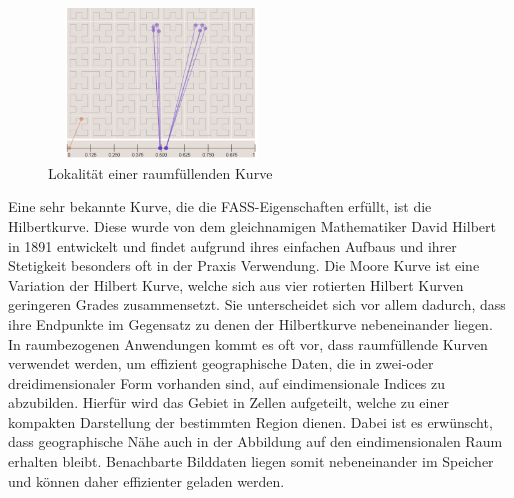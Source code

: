 \documentclass[course=erap]{aspdoc}
\begin{document}
\begin{figure}[h]
\centering
      \includegraphics[width=6cm, height=4cm]{Locality}
    \caption{Lokalität einer raumfüllenden Kurve}
    \label{fig:locality}
\end{figure}

Eine sehr bekannte Kurve, die die FASS-Eigenschaften erfüllt, ist die Hilbertkurve. Diese wurde von dem gleichnamigen Mathematiker David Hilbert in 1891 entwickelt und findet aufgrund ihres einfachen Aufbaus und ihrer Stetigkeit besonders oft in der Praxis Verwendung.
\newline
Die Moore Kurve ist eine Variation der Hilbert Kurve, welche sich aus vier rotierten Hilbert Kurven geringeren Grades zusammensetzt. Sie unterscheidet sich vor allem dadurch, dass ihre Endpunkte im Gegensatz zu denen der Hilbertkurve nebeneinander liegen.
\\
In raumbezogenen Anwendungen kommt es oft vor, dass raumfüllende Kurven verwendet werden, um effizient geographische Daten, die in zwei-oder dreidimensionaler Form vorhanden sind, auf eindimensionale Indices zu abzubilden. Hierfür wird das Gebiet in Zellen aufgeteilt, welche zu einer kompakten Darstellung der bestimmten Region dienen. Dabei ist es erwünscht, dass geographische Nähe auch in der Abbildung auf den eindimensionalen Raum erhalten bleibt. Benachbarte Bilddaten liegen somit nebeneinander im Speicher und können daher effizienter geladen werden.
\end{document}
